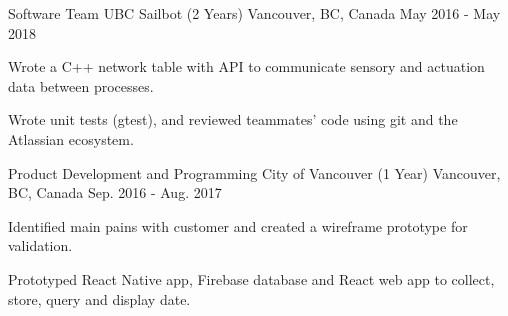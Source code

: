 

\begin{cventries}

\cventry
	{Software Team} %
	{UBC Sailbot (2 Years)} %
	{Vancouver, BC, Canada} %
	{May 2016 - May 2018} %
	{
	\begin{cvitems} %
		\item {Wrote a C++ network table with API to communicate sensory and actuation data between processes.}
		\item {Wrote unit tests (gtest), and reviewed teammates’ code using git and the Atlassian ecosystem.}
	\end{cvitems}
	}

\cventry
    {Product Development and Programming} %
    {City of Vancouver (1 Year)} %
    {Vancouver, BC, Canada} %
    {Sep. 2016 - Aug. 2017} %
    {
      \begin{cvitems} %
        \item {Identified main pains with customer and created a wireframe prototype for validation.}
        \item {Prototyped React Native app, Firebase database and React web app to collect, store, query and display date.}
      \end{cvitems}
    }



\end{cventries}
